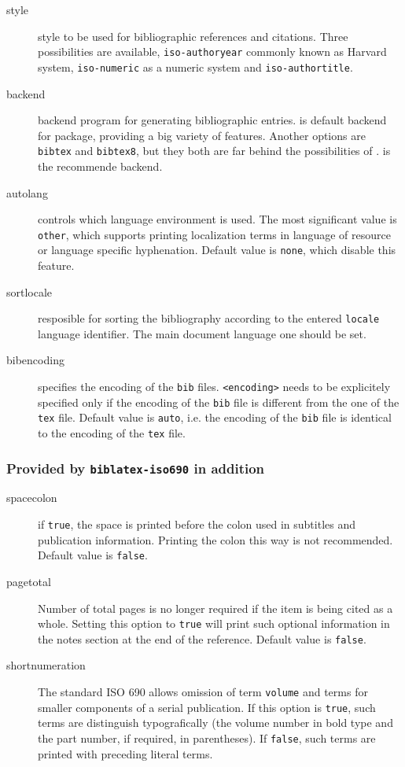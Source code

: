 \documentclass[a4paper,10pt]{ltxdockit}
\def\t|#1|{\texttt{#1}}
\newcommand*{\biber}{\sty{biber}\xspace}
\newcommand*{\biblatex}{\sty{biblatex}\xspace}
\begin{document}
\begin{description}
\item[style] style to be used for bibliographic references and citations.
Three possibilities are available, \t|iso-authoryear| commonly known as
Harvard system, \t|iso-numeric| as a numeric system and \t|iso-authortitle|.

\item[backend] backend program for generating bibliographic entries. \biber
is default backend for \biblatex package, providing a big variety
of features. Another options are \t|bibtex| and \t|bibtex8|, but they both
are far behind the possibilities of \biber. \biber is the recommende backend.

\item[autolang] controls which language environment is used. The most
significant value is \t|other|, which supports printing localization
terms in language of resource or language specific hyphenation. Default
value is \t|none|, which disable this feature.

\item[sortlocale] resposible for sorting the bibliography according to the
entered \t|locale| language identifier. The main document language one should
be set.

\item[bibencoding] specifies the encoding of the \t|bib| files. \t|<encoding>|
needs to be explicitely specified only if the encoding of the \t|bib| file
is different from the one of the \t|tex| file. Default value is \t|auto|, i.e.
the encoding of the \t|bib| file is identical to the encoding of the \t|tex|
file.
\end{description}

\subsubsection{Provided by \t|biblatex-iso690| in addition}

\begin{description}
  \item[spacecolon] if \t|true|, the space is printed before the colon
  used in subtitles and publication information. Printing the colon this way
  is not recommended. Default value is \t|false|.

  \item[pagetotal] Number of total pages is no longer required if the item
  is being cited as a whole. Setting this option to \t|true| will print
  such optional information in the notes section at the end of the reference.
  Default value is \t|false|.\label{pkg:opt:iso690:pp}

  \item[shortnumeration] The standard ISO 690 allows omission of term
  \t|volume| and terms for smaller components of a serial publication.
  If this option is \t|true|, such terms are distinguish typografically
  (the volume number in bold type and the part number, if required, in
  parentheses). If \t|false|, such terms are printed with preceding
  literal terms.
\end{description}
\end{document}
